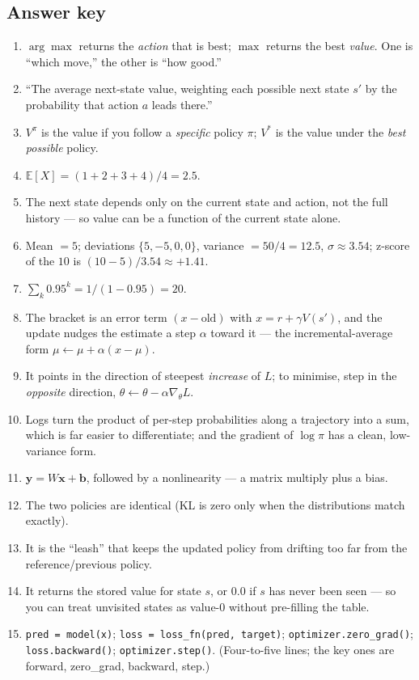 \documentclass[11pt]{article}
\begin{document}
\subsection*{Answer key}
\begin{enumerate}[label=\textbf{A\arabic*.}]
\item $\arg\max$ returns the \emph{action} that is best; $\max$ returns the best \emph{value}. One is ``which move,'' the other is ``how good.''
\item ``The average next-state value, weighting each possible next state $s'$ by the probability that action $a$ leads there.''
\item $V^\pi$ is the value if you follow a \emph{specific} policy $\pi$; $V^*$ is the value under the \emph{best possible} policy.
\item $\mathbb{E}[X] = (1+2+3+4)/4 = 2.5$.
\item The next state depends only on the current state and action, not the full history — so value can be a function of the current state alone.
\item Mean $=5$; deviations $\{5,-5,0,0\}$, variance $=50/4=12.5$, $\sigma\approx3.54$; z-score of the $10$ is $(10-5)/3.54 \approx +1.41$.
\item $\sum_k 0.95^k = 1/(1-0.95) = 20$.
\item The bracket is an error term $(x - \text{old})$ with $x = r+\gamma V(s')$, and the update nudges the estimate a step $\alpha$ toward it — the incremental-average form $\mu \leftarrow \mu + \alpha(x-\mu)$.
\item It points in the direction of steepest \emph{increase} of $L$; to minimise, step in the \emph{opposite} direction, $\theta \leftarrow \theta - \alpha\nabla_\theta L$.
\item Logs turn the product of per-step probabilities along a trajectory into a sum, which is far easier to differentiate; and the gradient of $\log\pi$ has a clean, low-variance form.
\item $\mathbf{y} = W\mathbf{x} + \mathbf{b}$, followed by a nonlinearity — a matrix multiply plus a bias.
\item The two policies are identical (KL is zero only when the distributions match exactly).
\item It is the ``leash'' that keeps the updated policy from drifting too far from the reference/previous policy.
\item It returns the stored value for state $s$, or $0.0$ if $s$ has never been seen — so you can treat unvisited states as value-$0$ without pre-filling the table.
\item \texttt{pred = model(x)}; \texttt{loss = loss\_fn(pred, target)}; \texttt{optimizer.zero\_grad()}; \texttt{loss.backward()}; \texttt{optimizer.step()}. (Four-to-five lines; the key ones are forward, zero\_grad, backward, step.)
\end{enumerate}
\end{document}
